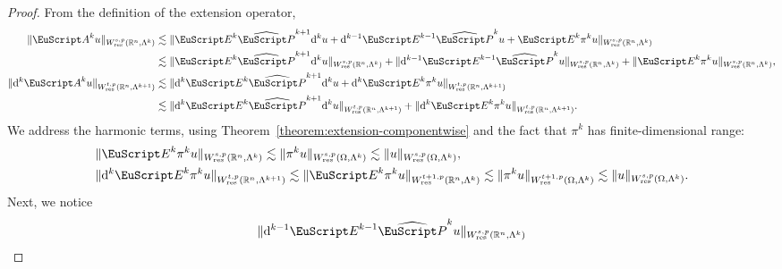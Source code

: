 \documentclass[10pt,a4paper]{amsart}
\theoremstyle{definition}
\theoremstyle{remark}
\numberwithin{equation}{section}
\newcommand{\bbR}{{\mathbb R}}
\newcommand{\euA}{{\EuScript A}}
\newcommand{\euE}{{\EuScript E}}
\newcommand{\euP}{{\EuScript P}}
\newcommand{\cartan}{{\mathrm d}}
\newcommand{\Domain}{{\Omega}}
\newcommand{\Alt}[1]{\Lambda^{#1}}
\newcommand{\Proj}{\pi}
\newcommand{\Poincare}{\euP}
\newcommand{\Extension}{\euE}
\newcommand{\Erweiterung}{\euA}
\newcommand{\Wres}{W_{\mathrm{res}}}
\begin{document}
\begin{proof}
    From the definition of the extension operator, 
    \begin{align*}
        \| \Erweiterung^{k} u \|_{\Wres^{s,p}(\bbR^{n},\Alt{k})}
        &
        \lesssim 
        \| 
            \Extension^{k} \widehat\Poincare^{k+1} \cartan^{k} u
            + 
            \cartan^{k-1} \Extension^{k-1} \widehat\Poincare^{k} u
            + 
            \Extension^{k} \Proj^{k} u 
        \|_{\Wres^{s,p}(\bbR^{n},\Alt{k})}
        \\&
        \lesssim
        \| \Extension^{k} \widehat\Poincare^{k+1} \cartan^{k} u \|_{\Wres^{s,p}(\bbR^{n},\Alt{k})}
        + 
        \| \cartan^{k-1} \Extension^{k-1} \widehat\Poincare^{k} u \|_{\Wres^{s,p}(\bbR^{n},\Alt{k})}
        +
        \| \Extension^{k} \Proj^{k} u \|_{\Wres^{s,p}(\bbR^{n},\Alt{k})}
        ,
        \\
        \| \cartan^{k} \Erweiterung^{k} u \|_{\Wres^{t,p}(\bbR^{n},\Alt{k+1})}
        &
        \lesssim 
        \| 
            \cartan^{k} \Extension^{k} \widehat\Poincare^{k+1} \cartan^{k} u
            + 
            \cartan^{k} \Extension^{k} \Proj^{k} u 
        \|_{\Wres^{t,p}(\bbR^{n},\Alt{k+1})}
        \\&
        \lesssim
        \| \cartan^{k} \Extension^{k} \widehat\Poincare^{k+1} \cartan^{k} u \|_{\Wres^{t,p}(\bbR^{n},\Alt{k+1})}
        +
        \| \cartan^{k} \Extension^{k} \Proj^{k} u \|_{\Wres^{t,p}(\bbR^{n},\Alt{k+1})}
        .
    \end{align*}
    We address the harmonic terms, using Theorem~\ref{theorem:extension-componentwise} and the fact that $\Proj^{k}$ has finite-dimensional range:
    \begin{align*}
        &
        \| \Extension^{k} \Proj^{k} u \|_{\Wres^{s,p}(\bbR^{n},\Alt{k})}
        \lesssim
        \| \Proj^{k} u \|_{\Wres^{s,p}(\Domain,\Alt{k})}
        \lesssim
        \| u \|_{\Wres^{s,p}(\Domain,\Alt{k})}
        ,
        \\
        &
        \| \cartan^{k} \Extension^{k} \Proj^{k} u \|_{\Wres^{t,p}(\bbR^{n},\Alt{k+1})}
        \lesssim
        \| \Extension^{k} \Proj^{k} u \|_{\Wres^{t+1,p}(\bbR^{n},\Alt{k})}
        \lesssim
        \| \Proj^{k} u \|_{\Wres^{t+1,p}(\Domain,\Alt{k})}
        \lesssim
        \| u \|_{\Wres^{s,p}(\Domain,\Alt{k})}
        .
    \end{align*}
    Next, we notice 
    \begin{align*}
        \| \cartan^{k-1} \Extension^{k-1} \widehat\Poincare^{k} u \|_{\Wres^{s,p}(\bbR^{n},\Alt{k})}

\end{align*}
\end{proof}
\end{document}
